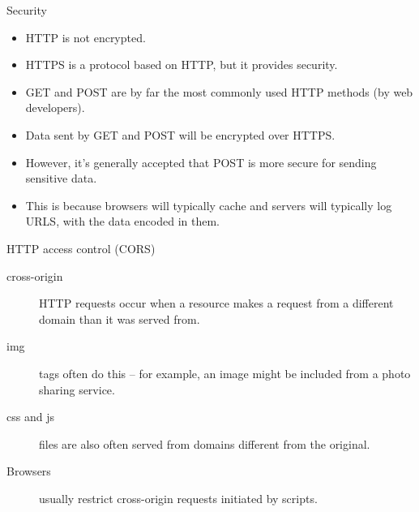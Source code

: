 \documentclass{beamer}
\begin{document}
\begin{frame}{Security}
  \begin{itemize}
    \item HTTP is not encrypted.
    \item HTTPS is a protocol based on HTTP, but it provides security.
    \item GET and POST are by far the most commonly used HTTP methods (by web developers).
    \item Data sent by GET and POST will be encrypted over HTTPS.
    \item However, it's generally accepted that POST is more secure for sending sensitive data.
    \item This is because browsers will typically cache and servers will typically log URLS, with the data encoded in them.
  \end{itemize}
\end{frame}



\begin{frame}[fragile]{HTTP access control (CORS)}
  \begin{description}
    \item[cross-origin] HTTP requests occur when a resource makes a request from a different domain than it was served from.
    \item[img] tags often do this -- for example, an image might be included from a photo sharing service.
    \item[css and js] files are also often served from domains different from the original.
    \item[Browsers] usually restrict cross-origin requests initiated by scripts.
  \end{description}
\end{frame}
\end{document}
